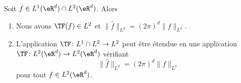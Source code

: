 \begin{theorem}       \label{THOooJLCDooAjTvJf}
    Soit \( f\in L^1(\eR^d)\cap L^2(\eR^d)\). Alors
    \begin{enumerate}
        \item
            Nous avons \( \TF(f)\in L^2\) et \( \| \hat f\|_{L^2}= (2\pi)^d  \| f \|_{L^2}\).
        \item
            L'application \( \TF\colon L^1\cap L^2\to L^2\) peut être étendue en une application \( \TF\colon L^2(\eR^d)\to L^2(\eR^d)\) vérifiant
            \begin{equation}
                \| \hat f \|_{L^2}=(2\pi)^d\| f \|_{L^2}
            \end{equation}
            pour tout \( f\in L^2(\eR^d)\).
    \end{enumerate}
\end{theorem}

